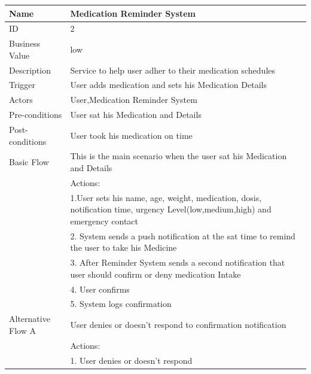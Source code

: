 \documentclass{article}
\begin{document}
\begin{table}[h!]
    \begin{tabularx}{\textwidth}{|>{\raggedright\arraybackslash}p{}|X|}
        \hline
        Name             & Medication Reminder System                               \\ \hline
        ID               & 2                                                                                     \\ \hline
        Business Value   & low                                                                                  \\ \hline
        Description      & Service to help user adher to their medication schedules  \\ \hline
        Trigger          & User adds medication and sets his Medication Details\\ \hline
        Actors           & User,Medication Reminder System                               \\ \hline
        Pre-conditions   & User sat his Medication and Details                                    \\ \hline
        Post-conditions  & User took his medication on time                                                   \\ \hline
        Basic Flow       & This is the main scenario when the user sat his Medication and Details \\ \hline
                         & Actions: \\
                         & 1.User sets his name, age, weight, medication, dosis, notification time, urgency Level(low,medium,high) and emergency contact\\
                         & 2. System sends a push notification at the sat time to remind the user to take his Medicine \\
                         & 3. After Reminder System sends a second notification that user should confirm or deny medication Intake\\
                         & 4. User confirms \\
                         & 5. System logs confirmation \\ \hline
        Alternative Flow A & User denies or doesn't respond to confirmation notification \\
                         & Actions: \\
                         & 1. User denies or doesn't respond \\

\end{tabularx}
\end{table}
\end{document}
